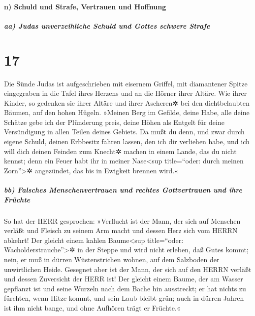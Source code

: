 \hypertarget{n-schuld-und-strafe-vertrauen-und-hoffnung}{%
\paragraph{n) Schuld und Strafe, Vertrauen und
Hoffnung}\label{n-schuld-und-strafe-vertrauen-und-hoffnung}}

\hypertarget{aa-judas-unverzeihliche-schuld-und-gottes-schwere-strafe}{%
\subparagraph{aa) Judas unverzeihliche Schuld und Gottes schwere
Strafe}\label{aa-judas-unverzeihliche-schuld-und-gottes-schwere-strafe}}

\hypertarget{section-16}{%
\section{17}\label{section-16}}

Die Sünde Judas ist aufgeschrieben mit eisernem Griffel,
mit diamantener Spitze eingegraben in die Tafel ihres Herzens und an die
Hörner ihrer Altäre. Wie ihrer Kinder, so gedenken sie
ihrer Altäre und ihrer Ascheren✲ bei den dichtbelaubten Bäumen, auf den
hohen Hügeln. »Meinen Berg im Gefilde, deine Habe, alle
deine Schätze gebe ich der Plünderung preis, deine Höhen als Entgelt für
deine Versündigung in allen Teilen deines Gebiets. Da mußt
du denn, und zwar durch eigene Schuld, deinen Erbbesitz fahren lassen,
den ich dir verliehen habe, und ich will dich deinen Feinden zum Knecht✲
machen in einem Lande, das du nicht kennst; denn ein Feuer habt ihr in
meiner Nase\textless sup title=``oder: durch meinen Zorn''\textgreater✲
angezündet, das bis in Ewigkeit brennen wird.«

\hypertarget{bb-falsches-menschenvertrauen-und-rechtes-gottvertrauen-und-ihre-fruxfcchte}{%
\subparagraph{bb) Falsches Menschenvertrauen und rechtes Gottvertrauen
und ihre
Früchte}\label{bb-falsches-menschenvertrauen-und-rechtes-gottvertrauen-und-ihre-fruxfcchte}}

So hat der HERR gesprochen: »Verflucht ist der Mann, der
sich auf Menschen verläßt und Fleisch zu seinem Arm macht und dessen
Herz sich vom HERRN abkehrt! Der gleicht einem kahlen
Baume\textless sup title=``oder: Wacholderstrauche''\textgreater✲ in der
Steppe und wird nicht erleben, daß Gutes kommt; nein, er muß in dürren
Wüstenstrichen wohnen, auf dem Salzboden der unwirtlichen Heide.
Gesegnet aber ist der Mann, der sich auf den HERRN verläßt
und dessen Zuversicht der HERR ist! Der gleicht einem
Baume, der am Wasser gepflanzt ist und seine Wurzeln nach dem Bache hin
ausstreckt; er hat nichts zu fürchten, wenn Hitze kommt, und sein Laub
bleibt grün; auch in dürren Jahren ist ihm nicht bange, und ohne
Aufhören trägt er Früchte.«

